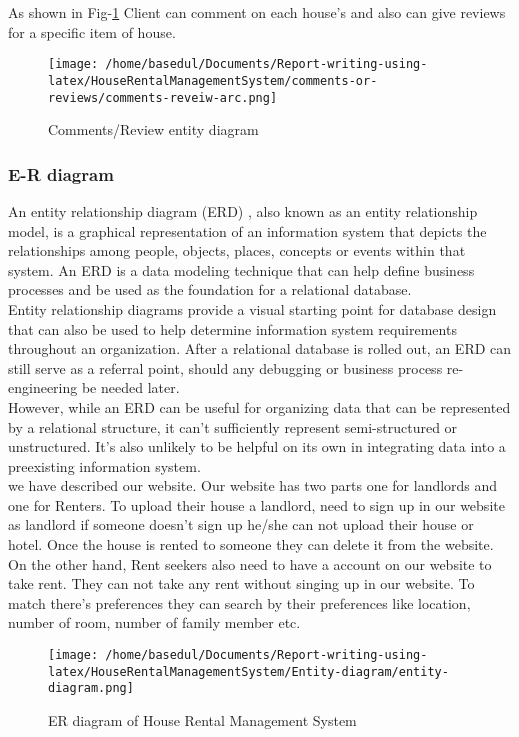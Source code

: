 \documentclass[12pt,a4paper]{article}
\newcommand\tab[1][.7cm]{\hspace*{#1}}
\begin{document}
	{As shown in Fig-\ref{fig:commentsent} Client can comment on each house's and also can give reviews for a specific item of house.} 
	\begin{figure}[H]
		\centering
		\texttt{[image: /home/basedul/Documents/Report-writing-using-latex/HouseRentalManagementSystem/comments-or-reviews/comments-reveiw-arc.png]}
		\caption{\hspace{0.35em}Comments/Review entity diagram}
		\label{fig:commentsent} 
	\end{figure}
	
	\subsubsection{E-R diagram}
		\tab An entity relationship diagram (ERD) \cite{Ref:14}, also known as an entity relationship model, is a graphical representation of an information system that depicts the relationships among people, objects, places, concepts or events within that system. An ERD is a data modeling technique that can help define business processes and be used as the foundation for a relational database.\\Entity relationship diagrams provide a visual starting point for database design that can also be used to help determine information system requirements throughout an organization. After a relational database is rolled out, an ERD can still serve as a referral point, should any debugging or business process re-engineering be needed later.\\However, while an ERD can be useful for organizing data that can be represented by a relational structure, it can't sufficiently represent semi-structured or unstructured. It's also unlikely to be helpful on its own in integrating data into a preexisting information system.\\we have described our website. Our website has two parts one for landlords and one
for Renters. To upload their house a landlord, need to sign up in our website as landlord if
someone doesn’t sign up he/she can not upload their house or hotel. Once the house is rented to
someone they can delete it from the website.
On the other hand, Rent seekers also need to have a account on our website to take rent. They can
not take any rent without singing up in our website. To match there’s preferences they can search
by their preferences like location, number of room, number of family member etc.
	
		\begin{figure}[H]
		\centering
		\texttt{[image: /home/basedul/Documents/Report-writing-using-latex/HouseRentalManagementSystem/Entity-diagram/entity-diagram.png]}
		\caption{\hspace{0.35em}ER diagram of House Rental Management System}
		\label{fig:erdig} 
	\end{figure}
	
\end{document}
